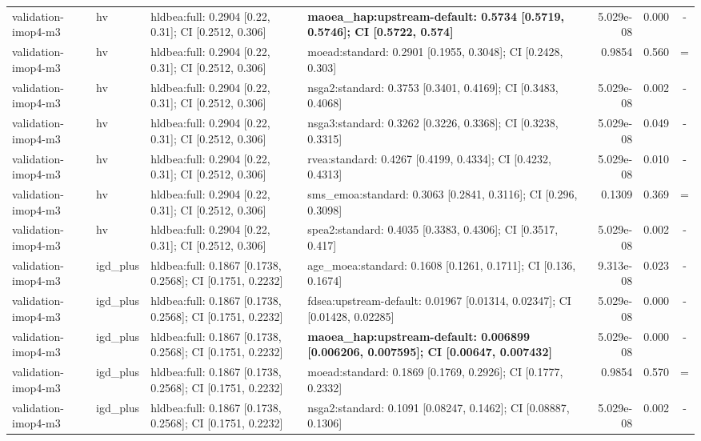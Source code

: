 \begin{tabular}{llllrrc}
validation-imop4-m3 & hv & hldbea:full: 0.2904 [0.22, 0.31]; CI [0.2512, 0.306] & \textbf{maoea\_hap:upstream-default: 0.5734 [0.5719, 0.5746]; CI [0.5722, 0.574]} & 5.029e-08 & 0.000 & - \\
validation-imop4-m3 & hv & hldbea:full: 0.2904 [0.22, 0.31]; CI [0.2512, 0.306] & moead:standard: 0.2901 [0.1955, 0.3048]; CI [0.2428, 0.303] & 0.9854 & 0.560 & = \\
validation-imop4-m3 & hv & hldbea:full: 0.2904 [0.22, 0.31]; CI [0.2512, 0.306] & nsga2:standard: 0.3753 [0.3401, 0.4169]; CI [0.3483, 0.4068] & 5.029e-08 & 0.002 & - \\
validation-imop4-m3 & hv & hldbea:full: 0.2904 [0.22, 0.31]; CI [0.2512, 0.306] & nsga3:standard: 0.3262 [0.3226, 0.3368]; CI [0.3238, 0.3315] & 5.029e-08 & 0.049 & - \\
validation-imop4-m3 & hv & hldbea:full: 0.2904 [0.22, 0.31]; CI [0.2512, 0.306] & rvea:standard: 0.4267 [0.4199, 0.4334]; CI [0.4232, 0.4313] & 5.029e-08 & 0.010 & - \\
validation-imop4-m3 & hv & hldbea:full: 0.2904 [0.22, 0.31]; CI [0.2512, 0.306] & sms\_emoa:standard: 0.3063 [0.2841, 0.3116]; CI [0.296, 0.3098] & 0.1309 & 0.369 & = \\
validation-imop4-m3 & hv & hldbea:full: 0.2904 [0.22, 0.31]; CI [0.2512, 0.306] & spea2:standard: 0.4035 [0.3383, 0.4306]; CI [0.3517, 0.417] & 5.029e-08 & 0.002 & - \\
validation-imop4-m3 & igd\_plus & hldbea:full: 0.1867 [0.1738, 0.2568]; CI [0.1751, 0.2232] & age\_moea:standard: 0.1608 [0.1261, 0.1711]; CI [0.136, 0.1674] & 9.313e-08 & 0.023 & - \\
validation-imop4-m3 & igd\_plus & hldbea:full: 0.1867 [0.1738, 0.2568]; CI [0.1751, 0.2232] & fdsea:upstream-default: 0.01967 [0.01314, 0.02347]; CI [0.01428, 0.02285] & 5.029e-08 & 0.000 & - \\
validation-imop4-m3 & igd\_plus & hldbea:full: 0.1867 [0.1738, 0.2568]; CI [0.1751, 0.2232] & \textbf{maoea\_hap:upstream-default: 0.006899 [0.006206, 0.007595]; CI [0.00647, 0.007432]} & 5.029e-08 & 0.000 & - \\
validation-imop4-m3 & igd\_plus & hldbea:full: 0.1867 [0.1738, 0.2568]; CI [0.1751, 0.2232] & moead:standard: 0.1869 [0.1769, 0.2926]; CI [0.1777, 0.2332] & 0.9854 & 0.570 & = \\
validation-imop4-m3 & igd\_plus & hldbea:full: 0.1867 [0.1738, 0.2568]; CI [0.1751, 0.2232] & nsga2:standard: 0.1091 [0.08247, 0.1462]; CI [0.08887, 0.1306] & 5.029e-08 & 0.002 & - \\

\end{tabular}
